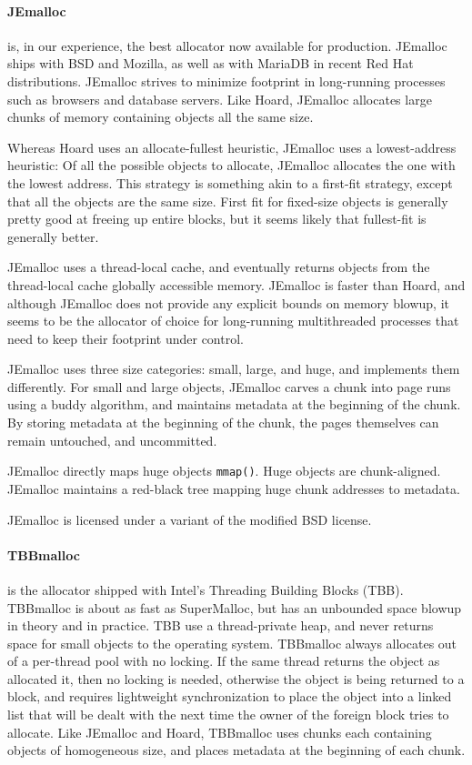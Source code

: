 \documentclass[pldi]{sigplanconf-pldi15}
\def\code{\lstinline[basicstyle=\ttfamily]}
\begin{document}
{\paragraph{JEmalloc}} \cite{Evans06} is, in our experience, the best
allocator now available for production.  JEmalloc ships with BSD and
Mozilla, as well as with MariaDB in recent Red Hat distributions.
JEmalloc strives to minimize footprint in long-running processes such
as browsers and database servers.  Like Hoard, JEmalloc allocates
large chunks of memory containing objects all the same size.  

Whereas Hoard uses an allocate-fullest heuristic, JEmalloc uses a
lowest-address heuristic: Of all the possible objects to allocate,
JEmalloc allocates the one with the lowest address.  This strategy is
something akin to a first-fit strategy, except that all the objects
are the same size.  First fit for fixed-size objects is generally
pretty good at freeing up entire blocks, but it seems likely that
fullest-fit is generally better.

JEmalloc uses a thread-local cache, and eventually returns objects
from the thread-local cache globally accessible memory.  JEmalloc is
faster than Hoard, and although JEmalloc does not provide any explicit
bounds on memory blowup, it seems to be the allocator of choice for
long-running multithreaded processes that need to keep their footprint
under control.

JEmalloc uses three size categories: small, large, and huge, and
implements them differently. For small and large objects, JEmalloc
carves a chunk into page runs using a buddy algorithm, and maintains
metadata at the beginning of the chunk.  By storing metadata at the
beginning of the chunk, the pages themselves can remain untouched, and
uncommitted.

JEmalloc directly maps huge objects \code{mmap()}.  Huge objects are
chunk-aligned.  JEmalloc maintains a red-black tree mapping huge chunk
addresses to metadata.

JEmalloc is licensed under a variant of the modified BSD license.

{\paragraph{TBBmalloc}} \cite{KukanovVo07} is the allocator shipped
with Intel's Threading Building Blocks (TBB)\@.  TBBmalloc is about as
fast as SuperMalloc, but has an unbounded space blowup in theory and
in practice.  TBB use a thread-private heap, and never returns space
for small objects to the operating system.  TBBmalloc always allocates
out of a per-thread pool with no locking.  If the same thread returns
the object as allocated it, then no locking is needed, otherwise the
object is being returned to a  block, and requires
lightweight synchronization to place the object into a linked list
that will be dealt with the next time the owner of the foreign block
tries to allocate.  Like JEmalloc and Hoard, TBBmalloc uses chunks
each containing objects of homogeneous size, and places metadata at
the beginning of each chunk.
\end{document}
